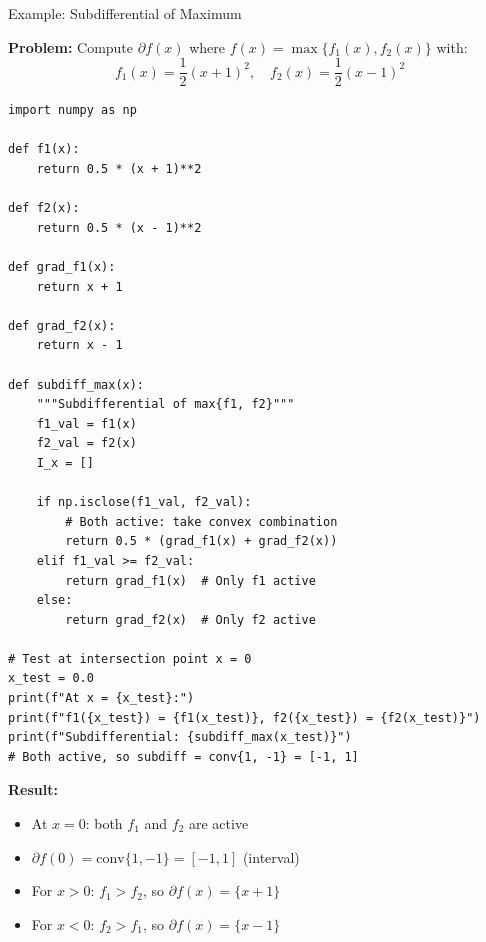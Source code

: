 \documentclass[aspectratio=169,10pt]{beamer}
\theoremstyle{definition}
\begin{document}
\begin{frame}[fragile]{Example: Subdifferential of Maximum}

\textbf{Problem:} Compute $\partial f(x)$ where
$f(x) = \max\{f_1(x), f_2(x)\}$ with:
$$f_1(x) = \frac{1}{2}(x+1)^2, \quad f_2(x) = \frac{1}{2}(x-1)^2$$

\vspace{0.3cm}

\begin{lstlisting}
import numpy as np

def f1(x):
    return 0.5 * (x + 1)**2

def f2(x):
    return 0.5 * (x - 1)**2

def grad_f1(x):
    return x + 1

def grad_f2(x):
    return x - 1

def subdiff_max(x):
    """Subdifferential of max{f1, f2}"""
    f1_val = f1(x)
    f2_val = f2(x)
    I_x = []

    if np.isclose(f1_val, f2_val):
        # Both active: take convex combination
        return 0.5 * (grad_f1(x) + grad_f2(x))
    elif f1_val >= f2_val:
        return grad_f1(x)  # Only f1 active
    else:
        return grad_f2(x)  # Only f2 active

# Test at intersection point x = 0
x_test = 0.0
print(f"At x = {x_test}:")
print(f"f1({x_test}) = {f1(x_test)}, f2({x_test}) = {f2(x_test)}")
print(f"Subdifferential: {subdiff_max(x_test)}")
# Both active, so subdiff = conv{1, -1} = [-1, 1]
\end{lstlisting}

\textbf{Result:}
\begin{itemize}
  \item At $x = 0$: both $f_1$ and $f_2$ are active
  \item $\partial f(0) = \text{conv}\{1, -1\} = [-1, 1]$ (interval)
  \item For $x > 0$: $f_1 > f_2$, so $\partial f(x) = \{x + 1\}$
  \item For $x < 0$: $f_2 > f_1$, so $\partial f(x) = \{x - 1\}$
\end{itemize}

\end{frame}
\end{document}
